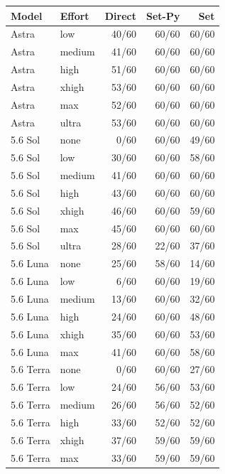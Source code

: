 \begin{tabular}{llrrr}
\toprule
Model & Effort & Direct & Set-Py & Set \\
\midrule
Astra & low & 40/60 & 60/60 & 60/60 \\
Astra & medium & 41/60 & 60/60 & 60/60 \\
Astra & high & 51/60 & 60/60 & 60/60 \\
Astra & xhigh & 53/60 & 60/60 & 60/60 \\
Astra & max & 52/60 & 60/60 & 60/60 \\
Astra & ultra & 53/60 & 60/60 & 60/60 \\
\midrule
5.6 Sol & none & 0/60 & 60/60 & 49/60 \\
5.6 Sol & low & 30/60 & 60/60 & 58/60 \\
5.6 Sol & medium & 41/60 & 60/60 & 60/60 \\
5.6 Sol & high & 43/60 & 60/60 & 60/60 \\
5.6 Sol & xhigh & 46/60 & 60/60 & 59/60 \\
5.6 Sol & max & 45/60 & 60/60 & 60/60 \\
5.6 Sol & ultra & 28/60 & 22/60 & 37/60 \\
\midrule
5.6 Luna & none & 25/60 & 58/60 & 14/60 \\
5.6 Luna & low & 6/60 & 60/60 & 19/60 \\
5.6 Luna & medium & 13/60 & 60/60 & 32/60 \\
5.6 Luna & high & 24/60 & 60/60 & 48/60 \\
5.6 Luna & xhigh & 35/60 & 60/60 & 53/60 \\
5.6 Luna & max & 41/60 & 60/60 & 58/60 \\
\midrule
5.6 Terra & none & 0/60 & 60/60 & 27/60 \\
5.6 Terra & low & 24/60 & 56/60 & 53/60 \\
5.6 Terra & medium & 26/60 & 56/60 & 52/60 \\
5.6 Terra & high & 33/60 & 52/60 & 52/60 \\
5.6 Terra & xhigh & 37/60 & 59/60 & 59/60 \\
5.6 Terra & max & 33/60 & 59/60 & 59/60 \\
\bottomrule
\end{tabular}
